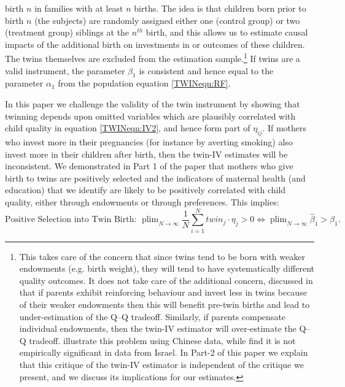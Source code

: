 \documentclass[subeqn]{article}
\DeclareMathOperator{\plim}{plim}
\begin{document}
\begin{spacing}{1.4}
birth $n$ in families with at least $n$ births. The idea is that children born prior to birth $n$ (the subjects) are randomly assigned either one (control group) or two
(treatment group) siblings at the $n^{th}$ birth, and this allows us to estimate causal impacts of the additional birth on investments in or outcomes of these children. The twins themselves are
excluded from the estimation sample.\footnote{This takes care of the concern that since twins tend to be born with weaker endowments (e.g. birth weight),
  they will tend to have systematically different quality outcomes. It does not take care of the additional concern, discussed in \citet{RosenzweigZhang2009} that if parents exhibit reinforcing behaviour and invest less in twins because of their weaker endowments then this will benefit pre-twin births and lead to under-estimation of the Q--Q tradeoff. Similarly, if parents compensate individual endowments, then the twin-IV estimator will over-estimate the Q--Q tradeoff. \citet{RosenzweigZhang2009} illustrate this problem using Chinese data, while \citet{Angristetal2010} find it is not empirically significant in data from Israel. In Part-2 of this paper we explain that this critique of the twin-IV estimator is independent of the critique we present, and we discuss its implications for our estimates.} %
If twins are a valid instrument, the parameter $\beta_1$ is consistent and hence
equal to the parameter $\alpha_1$ from the population equation \ref{TWINeqn:RF}.

In this paper we challenge the validity of the twin instrument by showing that twinning depends upon omitted variables which are plausibly correlated with child quality
in equation \ref{TWINeqn:IV2}, and hence form part of $\eta_{ij}$.  
If mothers who invest more in their pregnancies (for instance by averting smoking) also 
invest more in their children after birth, then the twin-IV estimates will be inconsistent. 
We demonstrated in Part 1 of the paper that mothers who give birth to twins are positively selected and the indicators of maternal health (and education) that we identify are likely to be positively correlated with child quality, either through endowments or through preferences. This implies:
\begin{equation}
  \text{Positive Selection into Twin Birth:\ \ \ }  \plim_{N\rightarrow\infty} \frac{1}{N}\sum_{i=1}^Ntwin_j\cdot \eta_j > 0 \Leftrightarrow \plim_{N\rightarrow\infty}\hat\beta_1 > \beta_1. \nonumber
\end{equation}


\end{spacing}
\end{document}
